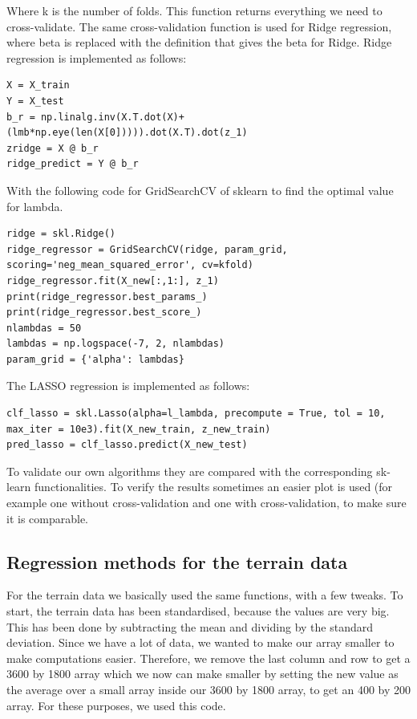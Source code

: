\documentclass[12pt]{extarticle}
\begin{document}
Where k is the number of folds. This function returns everything we need to cross-validate. The same cross-validation function is used for Ridge regression, where beta is replaced with the definition that gives the beta for Ridge. 
Ridge regression is implemented as follows:

\begin{lstlisting}
X = X_train
Y = X_test
b_r = np.linalg.inv(X.T.dot(X)+(lmb*np.eye(len(X[0])))).dot(X.T).dot(z_1)
zridge = X @ b_r
ridge_predict = Y @ b_r
\end{lstlisting}

With the following code for GridSearchCV of sklearn to find the optimal value for lambda. 

\begin{lstlisting}
ridge = skl.Ridge()
ridge_regressor = GridSearchCV(ridge, param_grid, scoring='neg_mean_squared_error', cv=kfold)
ridge_regressor.fit(X_new[:,1:], z_1)
print(ridge_regressor.best_params_)
print(ridge_regressor.best_score_)
nlambdas = 50
lambdas = np.logspace(-7, 2, nlambdas)
param_grid = {'alpha': lambdas}
\end{lstlisting}

The LASSO regression is implemented as follows: 

\begin{lstlisting}
clf_lasso = skl.Lasso(alpha=l_lambda, precompute = True, tol = 10, max_iter = 10e3).fit(X_new_train, z_new_train)
pred_lasso = clf_lasso.predict(X_new_test)
\end{lstlisting}

To validate our own algorithms they are compared with the corresponding sk-learn functionalities. To verify the results sometimes an easier plot is used (for example one without cross-validation and one with cross-validation, to make sure it is comparable.

\subsection{Regression methods for the terrain data}

For the terrain data we basically used the same functions, with a few tweaks. To start, the terrain data has been standardised, because the values are very big. This has been done by subtracting the mean and dividing by the standard deviation. Since we have a lot of data, we wanted to make our array smaller to make computations easier. Therefore, we remove the last column and row to get a 3600 by 1800 array which we now can make smaller by setting the new value as the average over a small array inside our 3600 by 1800 array, to get an 400 by 200 array. For these purposes, we used this code.
\end{document}
